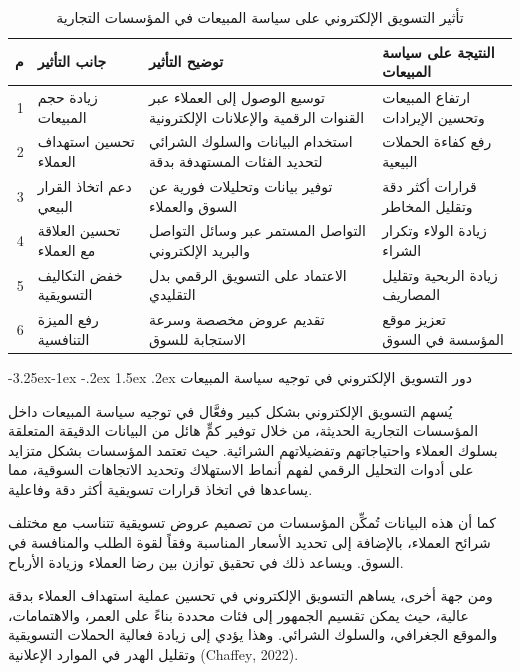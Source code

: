 \documentclass[12pt, a4paper]{report}
\makeatletter
\newcommand{\lr}[1]{\textenglish{#1}}
\renewcommand\subsection{\@startsection{subsection}{2}{\z@}%
  {-3.25ex\@plus -1ex \@minus -.2ex}%
  {1.5ex \@plus .2ex}%
  {\normalfont\large\bfseries\color{sectiongray}}}
\makeatother
\begin{document}
\begin{table}[h!]
\centering
\caption{تأثير التسويق الإلكتروني على سياسة المبيعات في المؤسسات التجارية}\label{tab:impact}
\begin{tabular}{|r|p{3cm}|p{4cm}|p{4cm}|}
\hline
\rowcolor{tableheader}
\textbf{م} & \textbf{جانب التأثير} & \textbf{توضيح التأثير} & \textbf{النتيجة على سياسة المبيعات} \\
\hline
1 & زيادة حجم المبيعات & توسيع الوصول إلى العملاء عبر القنوات الرقمية والإعلانات الإلكترونية & ارتفاع المبيعات وتحسين الإيرادات \\
\hline
2 & تحسين استهداف العملاء & استخدام البيانات والسلوك الشرائي لتحديد الفئات المستهدفة بدقة & رفع كفاءة الحملات البيعية \\
\hline
3 & دعم اتخاذ القرار البيعي & توفير بيانات وتحليلات فورية عن السوق والعملاء & قرارات أكثر دقة وتقليل المخاطر \\
\hline
4 & تحسين العلاقة مع العملاء & التواصل المستمر عبر وسائل التواصل والبريد الإلكتروني & زيادة الولاء وتكرار الشراء \\
\hline
5 & خفض التكاليف التسويقية & الاعتماد على التسويق الرقمي بدل التقليدي & زيادة الربحية وتقليل المصاريف \\
\hline
6 & رفع الميزة التنافسية & تقديم عروض مخصصة وسرعة الاستجابة للسوق & تعزيز موقع المؤسسة في السوق \\
\hline
\end{tabular}
\end{table}

\subsection{دور التسويق الإلكتروني في توجيه سياسة المبيعات}

يُسهم التسويق الإلكتروني بشكل كبير وفعَّال في توجيه سياسة المبيعات داخل المؤسسات التجارية الحديثة، من خلال توفير كمٍّ هائل من البيانات الدقيقة المتعلقة بسلوك العملاء واحتياجاتهم وتفضيلاتهم الشرائية. حيث تعتمد المؤسسات بشكل متزايد على أدوات التحليل الرقمي لفهم أنماط الاستهلاك وتحديد الاتجاهات السوقية، مما يساعدها في اتخاذ قرارات تسويقية أكثر دقة وفاعلية.

كما أن هذه البيانات تُمكِّن المؤسسات من تصميم عروض تسويقية تتناسب مع مختلف شرائح العملاء، بالإضافة إلى تحديد الأسعار المناسبة وفقاً لقوة الطلب والمنافسة في السوق. ويساعد ذلك في تحقيق توازن بين رضا العملاء وزيادة الأرباح.

ومن جهة أخرى، يساهم التسويق الإلكتروني في تحسين عملية استهداف العملاء بدقة عالية، حيث يمكن تقسيم الجمهور إلى فئات محددة بناءً على العمر، والاهتمامات، والموقع الجغرافي، والسلوك الشرائي. وهذا يؤدي إلى زيادة فعالية الحملات التسويقية وتقليل الهدر في الموارد الإعلانية (\lr{Chaffey}, 2022).
\end{document}
